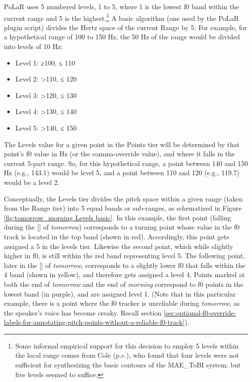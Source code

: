 \documentclass[11pt, twoside]{memoir}
\def\langtext#1{\textit{#1}}
\def\langtextquot#1{\langtext{#1}}
\def\ipatext#1{{\fontspec[Mapping=tex-text, Ligatures=NoCommon]{Cambria}{#1}}}
\def\ipabrackets#1{[\ipatext{#1}]}
\begin{document}
PoLaR uses 5 numbered levels, 1 to 5, where 1 is the lowest f0 band within the current range and 5 is the highest.\footnote{Some informal empirical support for this decision to employ 5 levels within the local range comes from Cole (p.c.), who found that four levels were not sufficient for synthesizing the basic contours of the MAE\_ToBI system, but five levels seemed to suffice.} A basic algorithm (one used by the PoLaR plugin script) divides the Hertz space of the current Range by 5. For example, for a hypothetical range of 100 to 150 Hz, the 50 Hz of the range would be divided into levels of 10 Hz:

\begin{itemize}
\item Level 1: ≥100, ≤ 110
\item Level 2: >110, ≤ 120
\item Level 3: >120, ≤ 130
\item Level 4: >130, ≤ 140
\item Level 5: >140, ≤ 150 \end{itemize}

The Levels value for a given point in the Points tier will be determined by that point’s f0 value in Hz (or the comma-override value), and where it falls in the current 5-part range. So, for this hypothetical range, a point between 140 and 150 Hz (e.g., 143.1) would be level 5, and a point between 110 and 120 (e.g., 119.7) would be a level 2.

Conceptually, the Levels tier divides the pitch space within a given range (taken from the Range tier) into 5 equal bands or sub-ranges, as schematized in Figure \ref{fig:tomorrow_morning Levels basic}. In this example, the first point (falling during the \ipabrackets{m} of \langtextquot{tomorrow}) corresponds to a turning point whose value in the f0 track is located in the top band (shown in red). Accordingly, this point gets assigned a 5 in the levels tier. Likewise the second point, which while slightly higher in f0, is still within the red band representing level 5. The following point, later in the \ipabrackets{a} of \langtextquot{tomorrow}, corresponds to a slightly lower f0 that falls within the 4 band (shown in yellow), and therefore gets assigned a level 4. Points marked at both the end of \langtextquot{tomorrow} and the end of \langtextquot{morning} correspond to f0 points in the lowest band (in purple), and are assigned level 1. (Note that in this particular example, there is a point where the f0 tracker is unreliable during \langtextquot{tomorrow}, as the speaker’s voice has become creaky. Recall section \ref{sec:optional-f0-override-labels-for-annotating-pitch-points-without-a-reliable-f0-track}).
\end{document}
